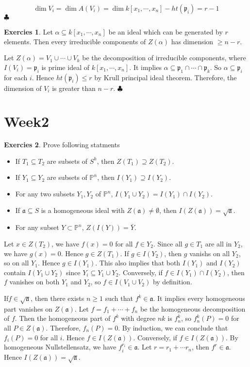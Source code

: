 \documentclass[12pt,a4paper]{article}
\theoremstyle{definition}
\newtheorem{exer}{Exercies}[subsection]
\newcommand*{\qeds}{\hfill\ensuremath{\clubsuit}}
\begin{document}
\[
\dim V_i = \dim A(V_i) = \dim k[x_1, \cdots, x_n] - ht(\mathfrak{p}_i)= r-1
\]
\qeds
\begin{exer}
	Let $\alpha \subseteq k[x_1, \cdots, x_n]$ be an ideal which can be generated by $r$ elements. Then every irreducible components of $Z(\alpha)$ has dimension $\geq n-r$.
\end{exer}
Let $Z(\alpha) = V_1 \cup \cdots \cup V_k$ be the decomposition of irreducible components, where $I(V_i) = \mathfrak{p}_i$ is prime ideal of $k[x_1, \cdots ,x_n]$. It implies $\alpha \subseteq \mathfrak{p}_1 \cap \cdots \cap \mathfrak{p}_k$. So $\alpha \subseteq \mathfrak{p}_i$ for each $i$. Hence $ht(\mathfrak{p}_i) \leq r$ by Krull principal ideal theorem. Therefore, the dimension of $V_i$ is greater than $n-r$.
\qeds
\section{Week2}
\begin{exer}
	Prove following statments
	\begin{itemize}
		\item If $T_1 \subseteq T_2$ are subsets of $S^h$, then $Z(T_1)\supseteq Z(T_2)$.
		\item If $Y_1 \subseteq Y_2$ are subsets of $\mathbb{P}^n$, then $I(Y_1) \supseteq I(Y_2)$.
		\item For any two subsets $Y_1,Y_2$ of $\mathbb{P}^n$, $I(Y_1 \cup Y_2) = I(Y_1) \cap I(Y_2)$.
		\item If $\mathfrak{a} \subseteq S$ is a homogeneous ideal with $Z(\mathfrak{a}) \neq \emptyset$, then $I(Z(\mathfrak{a}))= \sqrt{\mathfrak{a}}$.
		\item For any subset $Y \subset \mathbb{P}^n$, $Z(I(Y)) = \bar{Y}$.
	\end{itemize}

\end{exer}
Let $x \in Z(T_2)$, we have $f(x)=0$ for all $f \in Y_2$. Since all $g \in T_1$ are all in $Y_2$, we have $g(x)=0$. Hence $g \in Z(T_1)$. If $g \in I(Y_2)$, then $g$ vanishs on all $Y_2$, so on all $Y_1$. Hence $g \in I(Y_1)$. This also implies that both $I(Y_1)$ and $I(Y_2)$ contain $I(Y_1 \cup Y_2)$ since $Y_i \subseteq Y_1\cup Y_2$. Conversely, if $f \in I(Y_1) \cap I(Y_2)$, then $f$ vanishes on both $Y_1$ and $Y_2$, so $f \in I(V_1 \cup V_2)$ by definition.

If$f \in \sqrt{\mathfrak{a}}$, then there exists $n \geq 1$ such that $f^k \in \mathfrak{a}$. It implies every homogeneous part vanishes on $Z(\mathfrak{a})$. Let $f= f_1 + \cdots +f_n$ be the homogeneous decomposition of $f$. Then the homogeneous part of $f^k$ with degree $nk$ is $f^k_n$, so $f^k_n(P)=0$ for all $P \in Z(\mathfrak{a})$. Therefore, $f_n(P)=0$. By induction, we can conclude that $f_i(P)=0$ for all $i$. Hence $f \in I(Z(\mathfrak{a}))$. Conversely, if $f \in I(Z(\mathfrak{a}))$. By homogeneous Nullstellensatz, we have $f_i^{r_i} \in \mathfrak{a}$. Let $r= r_1+\cdots r_n$, then $f^r \in \mathfrak{a}$. Hence $I(Z(\mathfrak{a})) = \sqrt{\mathfrak{a}}$. 
\end{document}
